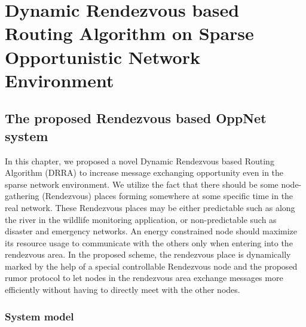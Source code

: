 \chapter{Dynamic Rendezvous based Routing Algorithm on Sparse Opportunistic Network Environment}
\label{DRRA}
\section{The proposed Rendezvous based OppNet system}
\label{DRRA:The proposed Rendezvous based OppNet system}
In this chapter, we proposed a novel Dynamic Rendezvous based Routing Algorithm (DRRA) to increase message exchanging opportunity even in the sparse network environment.
We utilize the fact that there should be some node-gathering (Rendezvous) places forming somewhere at some specific time in the real network.
These Rendezvous places may be either predictable such as along the river in the wildlife monitoring application, or non-predictable such as disaster and emergency networks.
An energy constrained node should maximize its resource usage to communicate with the others only when entering into the rendezvous area.
In the proposed scheme, the rendezvous place is dynamically marked by the help of a special controllable Rendezvous node and the proposed rumor protocol to let nodes in the rendezvous area exchange messages more efficiently without having to directly meet with the other nodes.

\subsection{System model}

